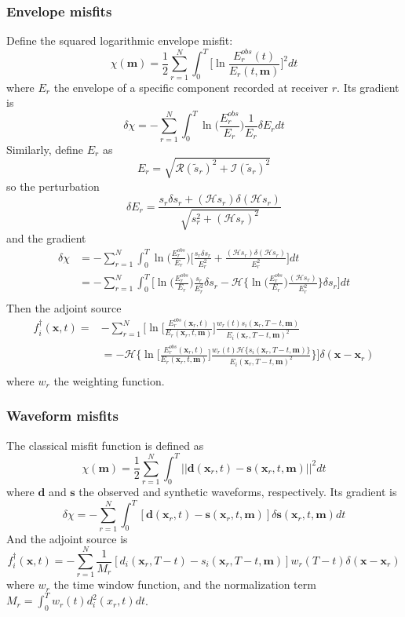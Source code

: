 \documentclass{article}
\newcommand{\mbf}[1]{\mathbf{#1}}
\newcommand{\mycR}{\mathcal{R}}
\newcommand{\mycI}{\mathcal{I}}
\newcommand{\mycH}{\mathcal{H}}
\begin{document}
\subsubsection{Envelope misfits}
Define the squared logarithmic envelope misfit:
\[ \chi(\mbf m)=\frac{1}{2}\sum_{r=1}^N\int_0^T\Big[\ln\frac{E_r^{obs}(t)}{E_r(t,\mbf m)}\Big]^2dt \]
where $E_r$ the envelope of a specific component recorded at receiver $r$. Its gradient is
\[ \delta\chi=-\sum_{r=1}^N\int_0^T\ln\Big(\frac{E_r^{obs}}{E_r}\Big)\frac{1}{E_r}\delta E_rdt \]
Similarly, define $E_r$ as
\[ E_r=\sqrt{\mycR(\tilde s_r)^2+\mycI(\tilde s_r)^2} \]
so the perturbation
\[ \delta E_r=\frac{s_r\delta s_r+(\mycH s_r)\delta(\mycH s_r)}{\sqrt{s_r^2+(\mycH s_r)^2}} \]
and the gradient
\begin{align*}
  \delta\chi & =-\sum_{r=1}^N\int_0^T\ln\Big(\frac{E_r^{obs}}{E_r}\Big)\Big[\frac{s_r\delta s_r}{E_r^2}+\frac{(\mycH s_r)\delta(\mycH s_r)}{E_r^2}\Big]dt \\
    & =-\sum_{r=1}^N\int_0^T\Big[\ln\Big(\frac{E_r^{obs}}{E_r}\Big)\frac{s_r}{E_r^2}\delta s_r-\mycH\Big\{\ln\Big(\frac{E_r^{obs}}{E_r}\Big)\frac{(\mycH s_r)}{E_r^2}\Big\}\delta s_r\Big]dt \\
\end{align*}
Then the adjoint source
\begin{align*}
  f_i^\dagger(\mbf x,t)= & -\sum_{r=1}^N\Big[\ln\Big[\frac{E_r^{obs}(\mbf x_r,t)}{E_r(\mbf x_r,t,\mbf m)}\Big]\frac{w_r(t)s_i(\mbf x_r,T-t,\mbf m)}{E_i(\mbf x_r,T-t,\mbf m)^2} \\
    & =-\mycH\Big\{\ln\Big[\frac{E_r^{obs}(\mbf x_r,t)}{E_r(\mbf x_r,t,\mbf m)}\Big]\frac{w_r(t)\mycH\{s_i(\mbf x_r,T-t,\mbf m)\}}{E_i(\mbf x_r,T-t,\mbf m)^2}\Big\}\Big]\delta(\mbf x-\mbf x_r) \\
\end{align*}
where $w_r$ the weighting function.\par
\subsubsection{Waveform misfits}
The classical misfit function is defined as
\[ \chi(\mbf m)=\frac{1}{2}\sum_{r=1}^N\int_0^T||\mbf d(\mbf x_r,t)-\mbf s(\mbf x_r,t,\mbf m)||^2dt \]
where $\mbf d$ and $\mbf s$ the observed and synthetic waveforms, respectively. Its gradient is
\[ \delta\chi=-\sum_{r=1}^N\int_0^T[\mbf d(\mbf x_r,t)-\mbf s(\mbf x_r,t,\mbf m)]\delta\mbf s(\mbf x_r,t,\mbf m)dt \]
And the adjoint source is
\[ f_i^\dagger(\mbf x,t)=-\sum_{r=1}^N\frac{1}{M_r}[d_i(\mbf x_r,T-t)-s_i(\mbf x_r,T-t,\mbf m)]w_r(T-t)\delta(\mbf x-\mbf x_r) \]
where $w_r$ the time window function, and the normalization term $M_r=\int_0^Tw_r(t)d_i^2(x_r,t)dt$.\par
\end{document}
